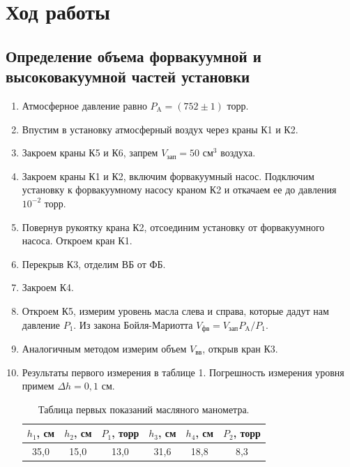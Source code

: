 \documentclass[a4paper,12pt]{article}
\begin{document}
\section{Ход работы}

\subsection{Определение объема форвакуумной и высоковакуумной частей
    установки}
    \begin{enumerate}
        \item Атмосферное давление равно $P_{\text{A}} = (752\pm1)$ торр.
        \item Впустим в установку атмосферный воздух через краны К1 и К2.
        \item Закроем краны К5 и К6, запрем $V_{\text{зап}} = 50$ см$^3$
        воздуха.
        \item Закроем краны К1 и К2, включим форвакуумный насос. Подключим
        установку к форвакуумному насосу краном К2 и откачаем ее до давления
        $10^{-2}$ торр.
        \item Повернув рукоятку крана К2, отсоединим установку от форвакуумного
        насоса. Откроем кран К1.
        \item Перекрыв К3, отделим ВБ от ФБ.
        \item Закроем К4.
        \item Откроем К5, измерим уровень масла слева и справа, которые
        дадут нам давление $P_1$.
        Из закона Бойля-Мариотта $V_{\text{фв}} = V_{\text{зап}}P_{\text{A}}/
        P_1$.
        \item Аналогичным методом измерим объем $V_{\text{вв}}$, открыв кран
        К3.
        \item Результаты первого измерения в таблице 1.
        Погрешность измерения уровня примем $\Delta h = 0{,}1$ см.
        \begin{table}[H]
            \centering
            \begin{tabular}{|c|c|c|c|c|c|}
                \hline
                $h_1$, см & $h_2$, см & $P_1$, торр & $h_3$, см & $h_4$, см & $P_2$, торр \\\hline
                35{,}0    & 15{,}0    & 13{,}0      & 31{,}6    & 18{,}8    & 8{,}3      \\\hline
            \end{tabular}
            \caption{Таблица первых показаний масляного манометра.}
        \end{table}


\end{enumerate}
\end{document}

